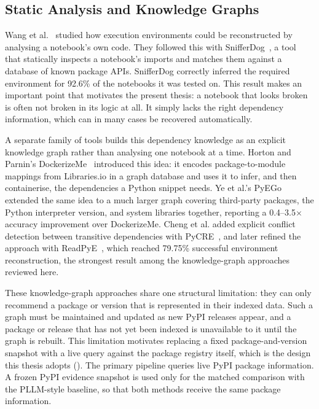 \subsection{Static Analysis and Knowledge Graphs}

Wang et al.~\cite{wang2020ase} studied how execution environments could
be reconstructed by analysing a notebook's own code. They followed this
with SnifferDog~\cite{wang2021snifferdog}, a tool that statically
inspects a notebook's imports and matches them against a database of
known package APIs. SnifferDog correctly inferred the required
environment for 92.6\% of the notebooks it was tested on. This result
makes an important point that motivates the present thesis: a notebook
that looks broken is often not broken in its logic at all. It simply
lacks the right dependency information, which can in many cases be
recovered automatically.

A separate family of tools builds this dependency knowledge as an explicit
knowledge graph rather than analysing one notebook at a time. Horton and
Parnin's DockerizeMe~\cite{horton2019dockerizeme} introduced this idea: it encodes
package-to-module mappings from Libraries.io in a graph database and uses it
to infer, and then containerise, the dependencies a Python snippet needs.
Ye et al.'s PyEGo~\cite{ye2022pyego} extended the same idea to a much larger
graph covering third-party packages, the Python interpreter version, and
system libraries together, reporting a 0.4--3.5$\times$ accuracy improvement
over DockerizeMe. Cheng et al. added explicit conflict detection between
transitive dependencies with PyCRE~\cite{cheng2022pycre}, and later refined
the approach with ReadPyE~\cite{cheng2024readpye}, which reached 79.75\%
successful environment reconstruction, the strongest result among the
knowledge-graph approaches reviewed here.

These knowledge-graph approaches share one structural limitation: they can
only recommend a package or version that is represented in their indexed
data. Such a graph must be maintained and updated as new PyPI releases
appear, and a package or release that has not yet been indexed is
unavailable to it until the graph is rebuilt. This limitation motivates
replacing a fixed package-and-version snapshot with a live query against
the package registry itself, which is the design this thesis adopts
(). The primary pipeline queries live PyPI package
information. A frozen PyPI evidence snapshot is used only for the matched
comparison with the PLLM-style baseline, so that both methods receive the
same package information.


